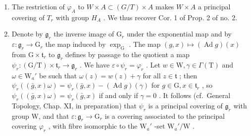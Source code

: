 \begin{enumerate}
\def\labelenumi{\arabic{enumi})}
\setcounter{enumi}{1}
\item
  The restriction of \(\varphi_{A}\) to \(W \times A \subset (G/T) \times A\) makes \(W \times A\) a principal covering of \(T_{r}\) with group \(H_{A}\) . We thus recover Cor. 1 of Prop. 2 of no. 2.
\item
  Denote by \(\mathfrak{g}_r\) the inverse image of \(\mathrm{G}_r\) under the exponential map and by \(\varepsilon : \mathfrak{g}_r \to \mathrm{G}_r\) the map induced by \(\exp_{\mathrm{G}}\) . The map \((g, x) \mapsto (\operatorname{Ad} g)(x)\) from \(\mathrm{G} \times \mathfrak{t}_r\) to \(\mathfrak{g}_r\) defines by passage to the quotient a map \(\psi_r : (\mathrm{G} / \mathrm{T}) \times \mathfrak{t}_r \to \mathfrak{g}_r\) . We have \(\varepsilon \circ \psi_r = \varphi_r\) . Let \(w \in \mathrm{W}, \gamma \in \Gamma(\mathrm{T})\) and \(\omega \in \mathrm{W}_a'\) be such that \(\omega(z) = w(z) + \gamma\) for all \(z \in \mathfrak{t}\) ; then \(\psi_r((\bar{g}, x)\omega) = \psi_r(\bar{g}, x) - (\operatorname{Ad} g)(\gamma)\) for \(g \in \mathrm{G}, x \in \mathfrak{t}_r\) , so \(\psi_r((\bar{g}, x)\omega) = \psi_r(\bar{g}, x)\) if and only if \(\gamma = 0\) . It follows (cf.~General Topology, Chap. XI, in preparation) that \(\psi_r\) is a principal covering of \(\mathfrak{g}_r\) with group W, and that \(\varepsilon : \mathfrak{g}_r \to \mathrm{G}_r\) is a covering associated to the principal covering \(\varphi_r\) , with fibre isomorphic to the \(\mathrm{W}_a'\) -set \(\mathrm{W}_a'/\mathrm{W}\) .
\end{enumerate}

